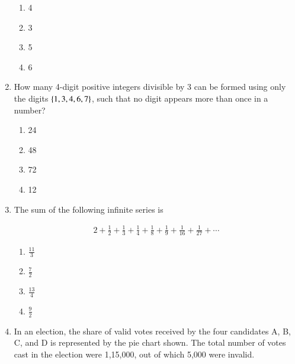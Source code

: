 \documentclass[journal]{IEEEtran}
\begin{document}
\begin{enumerate}
\begin{multicols}{4}
\begin{enumerate}
\item 4
\item 3
\item 5
\item 6
\end{enumerate}
\end{multicols}

\item How many 4-digit positive integers divisible by 3 can be formed using only the digits
$\left\{1, 3, 4, 6, 7\right\}$, such that no digit appears more than once in a number?
\hfill{}

\begin{multicols}{4}
\begin{enumerate}
\item 24
\item 48
\item 72
\item 12
\end{enumerate}
\end{multicols}

\item The sum of the following infinite series is

\begin{align*}
2 + \frac{1}{2} + \frac{1}{3} + \frac{1}{4} + \frac{1}{8} + \frac{1}{9} + \frac{1}{16} + \frac{1}{27} + \cdots
\end{align*}
\hfill{}

\begin{multicols}{4}
\begin{enumerate}
\item $\frac{11}{3}$
\item $\frac{7}{2}$
\item $\frac{13}{4}$
\item $\frac{9}{2}$
\end{enumerate}
\end{multicols}

\item In an election, the share of valid votes received by the four candidates A, B, C, and D is represented by the pie chart shown. The total number of votes cast in the election were 1,15,000, out of which 5,000 were invalid. 
\hfill{}


\end{enumerate}
\end{document}
